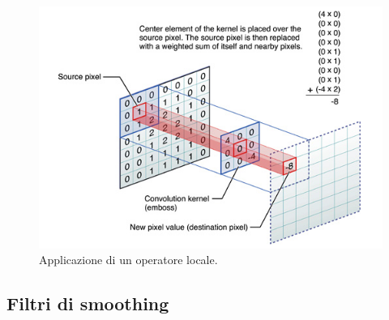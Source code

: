 \begin{figure}
\centering
\includegraphics[width=.8\textwidth]{img/convoluzione.png}
\caption{Applicazione di un operatore locale.}
\label{fig:convoluzione}
\end{figure}

\subsection{Filtri di smoothing}

